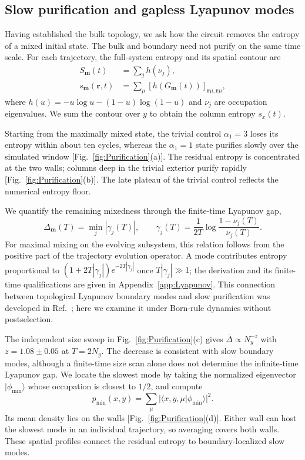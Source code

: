 \documentclass[aps,prb,10pt,twocolumn,superscriptaddress,longbibliography,floatfix]{revtex4-2}
\newcommand{\bfr}{\boldsymbol r}
\newcommand{\rec}{\mathbf m}   %
\begin{document}
{\color{blue}
\subsection{Slow purification and gapless Lyapunov modes}
\label{sec:Purification}

Having established the bulk topology, we ask how the circuit removes the entropy of a mixed initial state. The bulk and boundary need not purify on the same time scale. For each trajectory, the full-system entropy and its spatial contour are
\begin{align}
 S_{\rec}(t)&=\sum_j h(\nu_j),\nonumber\\
 s_{\rec}(\bfr,t)&=\sum_\mu[h(G_{\rec}(t))]_{\bfr\mu,\bfr\mu},
 \label{eq:BinaryEntropy}
\end{align}
where $h(u)=-u\log u-(1-u)\log(1-u)$ and $\nu_j$ are occupation eigenvalues. We sum the contour over $y$ to obtain the column entropy $s_x(t)$.

Starting from the maximally mixed state, the trivial control $\alpha_1=3$ loses its entropy within about ten cycles, whereas the $\alpha_1=1$ state purifies slowly over the simulated window [Fig.~\ref{fig:Purification}(a)]. The residual entropy is concentrated at the two walls; columns deep in the trivial exterior purify rapidly [Fig.~\ref{fig:Purification}(b)]. The late plateau of the trivial control reflects the numerical entropy floor.

We quantify the remaining mixedness through the finite-time Lyapunov gap,
\begin{equation}
 \Delta_{\rec}(T)=\min_j|\gamma_j(T)|,\qquad
 \gamma_j(T)=\frac{1}{2T}\log\frac{1-\nu_j(T)}{\nu_j(T)}.
 \label{eq:LyapunovFromOccupations}
\end{equation}
For maximal mixing on the evolving subsystem, this relation follows from the positive part of the trajectory evolution operator. A mode contributes entropy proportional to $(1+2T|\gamma_j|)e^{-2T|\gamma_j|}$ once $T|\gamma_j|\gg1$; the derivation and its finite-time qualifications are given in Appendix~\ref{app:Lyapunov}. This connection between topological Lyapunov boundary modes and slow purification was developed in Ref.~\cite{XiaoKawabata2026}; here we examine it under Born-rule dynamics without postselection.

The independent size sweep in Fig.~\ref{fig:Purification}(c) gives $\overline\Delta\propto N_y^{-z}$ with $z=1.08\pm0.05$ at $T=2N_y$. The decrease is consistent with slow boundary modes, although a finite-time size scan alone does not determine the infinite-time Lyapunov gap. We locate the slowest mode by taking the normalized eigenvector $|\phi_{\min}\rangle$ whose occupation is closest to $1/2$, and compute
\begin{equation}
 p_{\min}(x,y)=\sum_\mu|\langle x,y,\mu|\phi_{\min}\rangle|^2.
 \label{eq:SlowestModeDensity}
\end{equation}
Its mean density lies on the walls [Fig.~\ref{fig:Purification}(d)]. Either wall can host the slowest mode in an individual trajectory, so averaging covers both walls. These spatial profiles connect the residual entropy to boundary-localized slow modes.
}
\end{document}
